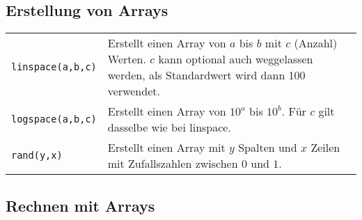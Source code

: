 \subsection{Erstellung von Arrays}
\begin{tabularx}{\textwidth}{p{3cm} p{15cm}}
    \texttt{linspace(a,b,c)} &
    Erstellt einen Array von $a$ bis $b$ mit $c$ (Anzahl) Werten. $c$ kann
    optional auch weggelassen werden, als Standardwert wird dann 100 verwendet.
  \\
    \texttt{logspace(a,b,c)} &
    Erstellt einen Array von $10^a$ bis $10^b$. Für $c$ gilt dasselbe wie bei
    linspace.
  \\
    \texttt{rand(y,x)} &
    Erstellt einen Array mit $y$ Spalten und $x$ Zeilen mit Zufallszahlen
    zwischen $0$ und $1$.
\end{tabularx}


\subsection{Rechnen mit Arrays}